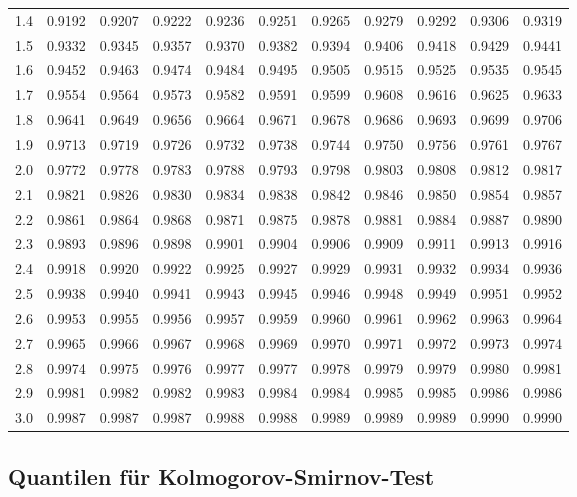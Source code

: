 \begin{center}
\begin{tabular}{|r|rrrrrrrrrr|}
        1.4&0.9192&0.9207&0.9222&0.9236&0.9251&0.9265&0.9279&0.9292&0.9306&0.9319\\
        1.5&0.9332&0.9345&0.9357&0.9370&0.9382&0.9394&0.9406&0.9418&0.9429&0.9441\\
        1.6&0.9452&0.9463&0.9474&0.9484&0.9495&0.9505&0.9515&0.9525&0.9535&0.9545\\
        1.7&0.9554&0.9564&0.9573&0.9582&0.9591&0.9599&0.9608&0.9616&0.9625&0.9633\\
        1.8&0.9641&0.9649&0.9656&0.9664&0.9671&0.9678&0.9686&0.9693&0.9699&0.9706\\
        1.9&0.9713&0.9719&0.9726&0.9732&0.9738&0.9744&0.9750&0.9756&0.9761&0.9767\\
        2.0&0.9772&0.9778&0.9783&0.9788&0.9793&0.9798&0.9803&0.9808&0.9812&0.9817\\
        2.1&0.9821&0.9826&0.9830&0.9834&0.9838&0.9842&0.9846&0.9850&0.9854&0.9857\\
        2.2&0.9861&0.9864&0.9868&0.9871&0.9875&0.9878&0.9881&0.9884&0.9887&0.9890\\
        2.3&0.9893&0.9896&0.9898&0.9901&0.9904&0.9906&0.9909&0.9911&0.9913&0.9916\\
        2.4&0.9918&0.9920&0.9922&0.9925&0.9927&0.9929&0.9931&0.9932&0.9934&0.9936\\
        2.5&0.9938&0.9940&0.9941&0.9943&0.9945&0.9946&0.9948&0.9949&0.9951&0.9952\\
        2.6&0.9953&0.9955&0.9956&0.9957&0.9959&0.9960&0.9961&0.9962&0.9963&0.9964\\
        2.7&0.9965&0.9966&0.9967&0.9968&0.9969&0.9970&0.9971&0.9972&0.9973&0.9974\\
        2.8&0.9974&0.9975&0.9976&0.9977&0.9977&0.9978&0.9979&0.9979&0.9980&0.9981\\
        2.9&0.9981&0.9982&0.9982&0.9983&0.9984&0.9984&0.9985&0.9985&0.9986&0.9986\\
        3.0&0.9987&0.9987&0.9987&0.9988&0.9988&0.9989&0.9989&0.9989&0.9990&0.9990\\
        \hline
    \end{tabular}
\end{center}


\subsection{Quantilen für Kolmogorov-Smirnov-Test}
\label{Quantilen für Kolmogorov-Smirnov-Test}
    
